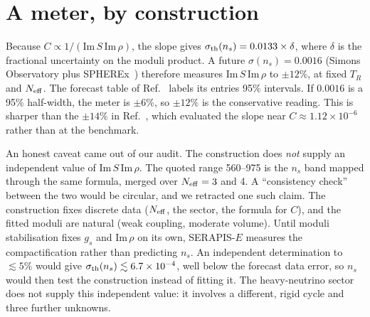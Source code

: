 \documentclass[aps,prd,twocolumn,superscriptaddress,nofootinbib,showkeys]{revtex4-2}
\begin{document}
\section{A meter, by construction}
Because $C\propto1/(\mathrm{Im}\,S\,\mathrm{Im}\,\rho)$, the slope gives $\sigma_{\rm th}(n_s)=0.0133\times\delta$, where $\delta$ is the fractional uncertainty on the moduli product. A future $\sigma(n_s)=0.0016$ (Simons Observatory plus SPHEREx~\cite{SOfc}) therefore measures $\mathrm{Im}\,S\,\mathrm{Im}\,\rho$ to $\pm12\%$, at fixed $T_R$ and $N_{\rm eff}$. The forecast table of Ref.~\cite{SOfc} labels its entries 95\% intervals. If $0.0016$ is a 95\% half-width, the meter is $\pm6\%$, so $\pm12\%$ is the conservative reading. This is sharper than the $\pm14\%$ in Ref.~\cite{P5}, which evaluated the slope near $C\approx1.12\times10^{-6}$ rather than at the benchmark.

An honest caveat came out of our audit. The construction does \emph{not} supply an independent value of $\mathrm{Im}\,S\,\mathrm{Im}\,\rho$. The quoted range 560--975 is the $n_s$ band mapped through the same formula, merged over $N_{\rm eff}=3$ and 4. A ``consistency check'' between the two would be circular, and we retracted one such claim. The construction fixes discrete data ($N_{\rm eff}$, the sector, the formula for $C$), and the fitted moduli are natural (weak coupling, moderate volume). Until moduli stabilisation fixes $g_s$ and $\mathrm{Im}\,\rho$ on its own, SERAPIS-$E$ measures the compactification rather than predicting $n_s$. An independent determination to $\lesssim5\%$ would give $\sigma_{\rm th}(n_s)\lesssim6.7\times10^{-4}$, well below the forecast data error, so $n_s$ would then test the construction instead of fitting it. The heavy-neutrino sector does not supply this independent value: it involves a different, rigid cycle and three further unknowns.
\end{document}

